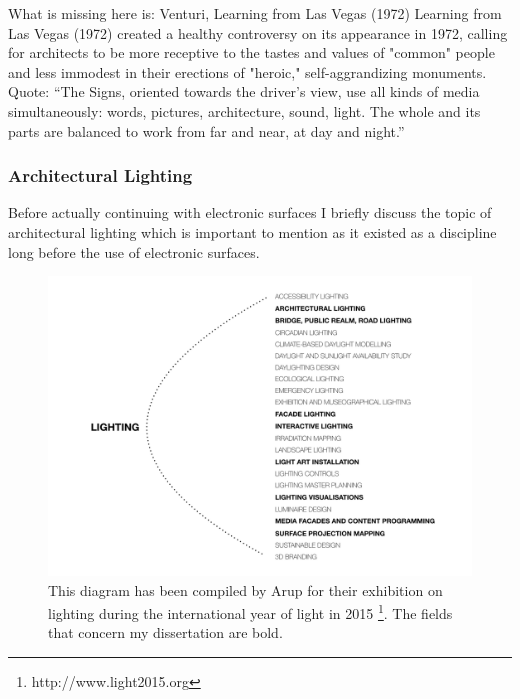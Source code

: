

What is missing here is: Venturi, Learning from Las Vegas (1972)
Learning from Las Vegas (1972) created a healthy controversy on its appearance in 1972, calling for architects to be more receptive to the tastes and values of "common" people and less immodest in their erections of "heroic," self-aggrandizing monuments.
Quote: “The Signs, oriented towards the driver’s view, use all kinds of media simultaneously: words, pictures, architecture, sound, light. The whole and its parts are balanced to work from far and near, at day and night.”


\subsubsection{Architectural Lighting}

Before actually continuing with electronic surfaces I briefly discuss the topic of architectural lighting which is important to mention as it existed as a discipline long before the use of electronic surfaces.


\begin{figure} [h!]
    \centering
        \includegraphics[width=12cm]{Illustrations/lighting_fields.pdf}
    \caption[Fields of Architectural Lighting]{This diagram has been compiled by Arup for their exhibition on lighting during the international year of light in 2015 \footnote{http://www.light2015.org}. The fields that concern my dissertation are bold.}
    \label{InterfacingArchitecture}
\end{figure}


